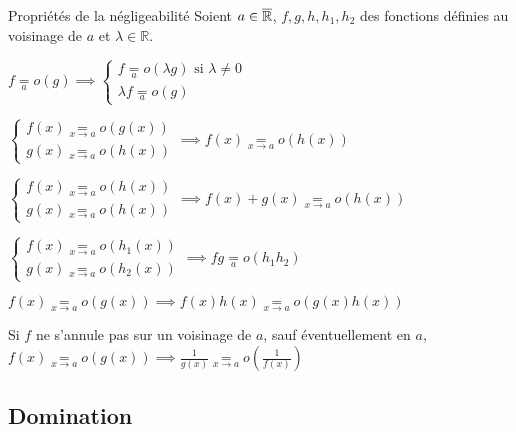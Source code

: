    \begin{prop}{Propriétés de la négligeabilité}{}
        Soient $a \in \overline{\mathbb{R}}$, $f,g,h,h_1,h_2$ des fonctions définies au voisinage de $a$ et $\lambda \in \mathbb{R}$.
    
        \begin{alors}
            \item $f \underset{a}{=} o(g) \implies \left\{ \begin{array}{l}
                f \underset{a}{=} o(\lambda g) \text{ si } \lambda \neq 0 \\
                \lambda f \underset{a}{=} o(g)
            \end{array}\right.$
            \item $ \left\{ \begin{array}{l}
                f(x) \underset{x \rightarrow a}{=} o(g(x)) \\
                g(x) \underset{x \rightarrow a}{=} o(h(x))
            \end{array} \right. \implies f(x) \underset{x \rightarrow a}{=} o(h(x))$
            \item $\left\{ \begin{array}{l}
                f(x) \underset{x \rightarrow a}{=} o(h(x)) \\
                g(x) \underset{x \rightarrow a}{=} o(h(x))
            \end{array} \right. \implies f(x) + g(x) \underset{x \rightarrow a}{=} o(h(x))$
            \item $\left\{ \begin{array}{l}
                f(x) \underset{x \rightarrow a}{=} o(h_1(x)) \\
                g(x) \underset{x \rightarrow a}{=} o(h_2(x))
            \end{array} \right. \implies fg \underset{a}{=} o(h_1 h_2)$
            \item $ f(x) \underset{x \rightarrow a}{=} o(g(x)) \implies f(x) h(x) \underset{x \rightarrow a}{=} o(g(x) h(x))$
            \item Si $f$ ne s’annule pas sur un voisinage de $a$, sauf éventuellement en $a$, \\ $ f(x) \underset{x \rightarrow a}{=} o(g(x)) \implies \frac{1}{g(x)} \underset{x \rightarrow a}{=} o\left(\frac{1}{f(x)}\right)$
        \end{alors}
    \end{prop}

\subsection{Domination}

